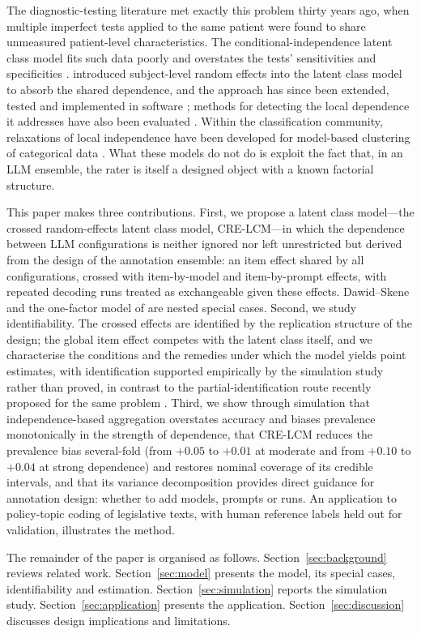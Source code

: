 The diagnostic-testing literature met exactly this problem thirty years ago, when multiple imperfect tests applied to the same patient were found to share unmeasured patient-level characteristics. The conditional-independence latent class model fits such data poorly \citep{Qu1996} and overstates the tests' sensitivities and specificities \citep{Vacek1985}. \citet{Qu1996} introduced subject-level random effects into the latent class model to absorb the shared dependence, and the approach has since been extended, tested and implemented in software \citep{Beath2017,Xu2019}; methods for detecting the local dependence it addresses have also been evaluated \citep{Oberski2013}. Within the classification community, relaxations of local independence have been developed for model-based clustering of categorical data \citep{Marbac2016,Oberski2016}. What these models do not do is exploit the fact that, in an LLM ensemble, the rater is itself a designed object with a known factorial structure.

This paper makes three contributions. First, we propose a latent class model---the crossed random-effects latent class model, CRE-LCM---in which the dependence between LLM configurations is neither ignored nor left unrestricted but derived from the design of the annotation ensemble: an item effect shared by all configurations, crossed with item-by-model and item-by-prompt effects, with repeated decoding runs treated as exchangeable given these effects. Dawid--Skene and the one-factor model of \citet{Qu1996} are nested special cases. Second, we study identifiability. The crossed effects are identified by the replication structure of the design; the global item effect competes with the latent class itself, and we characterise the conditions and the remedies under which the model yields point estimates, with identification supported empirically by the simulation study rather than proved, in contrast to the partial-identification route recently proposed for the same problem \citep{Chen2026}. Third, we show through simulation that independence-based aggregation overstates accuracy and biases prevalence monotonically in the strength of dependence, that CRE-LCM reduces the prevalence bias several-fold (from $+0.05$ to $+0.01$ at moderate and from $+0.10$ to $+0.04$ at strong dependence) and restores nominal coverage of its credible intervals, and that its variance decomposition provides direct guidance for annotation design: whether to add models, prompts or runs. An application to policy-topic coding of legislative texts, with human reference labels held out for validation, illustrates the method.

The remainder of the paper is organised as follows. Section~\ref{sec:background} reviews related work. Section~\ref{sec:model} presents the model, its special cases, identifiability and estimation. Section~\ref{sec:simulation} reports the simulation study. Section~\ref{sec:application} presents the application. Section~\ref{sec:discussion} discusses design implications and limitations.
